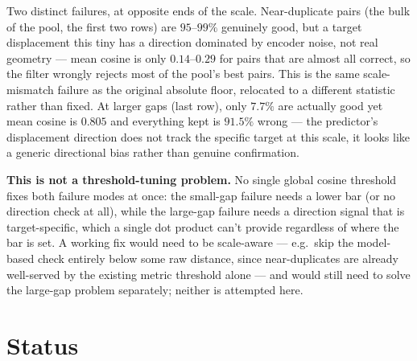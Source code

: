 \documentclass[11pt]{article}
\begin{document}
Two distinct failures, at opposite ends of the scale. Near-duplicate pairs (the bulk of the
pool, the first two rows) are $95$--$99\%$ genuinely good, but a target displacement this
tiny has a direction dominated by encoder noise, not real geometry --- mean cosine is only
$0.14$--$0.29$ for pairs that are almost all correct, so the filter wrongly rejects most of
the pool's best pairs. This is the same scale-mismatch failure as the original absolute
floor, relocated to a different statistic rather than fixed. At larger gaps (last row), only
$7.7\%$ are actually good yet mean cosine is $0.805$ and everything kept is $91.5\%$ wrong ---
the predictor's displacement direction does not track the specific target at this scale, it
looks like a generic directional bias rather than genuine confirmation.

\textbf{This is not a threshold-tuning problem.} No single global cosine threshold fixes both
failure modes at once: the small-gap failure needs a lower bar (or no direction check at
all), while the large-gap failure needs a direction signal that is target-specific, which a
single dot product can't provide regardless of where the bar is set. A working fix would need
to be scale-aware --- e.g.\ skip the model-based check entirely below some raw distance, since
near-duplicates are already well-served by the existing metric threshold alone --- and would
still need to solve the large-gap problem separately; neither is attempted here.

\section{Status}
\end{document}
